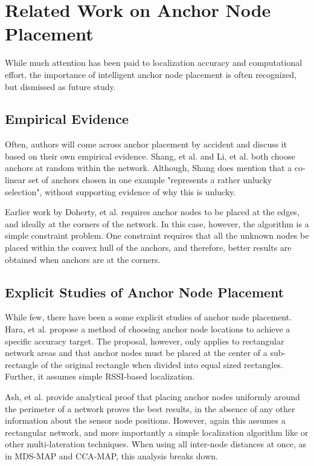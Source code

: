 \chapter{Related Work on Anchor Node Placement}
\label{chap:RelatedWork}
While much attention has been paid to localization accuracy and computational effort, the importance of intelligent anchor node placement is often recognized, but dismissed as future study.

\section{Empirical Evidence}
\label{sec:RelatedWorkEmpirical}
Often, authors will come across anchor placement by accident and discuss it based on their own empirical evidence.  Shang, et al.\cite[p. 964]{MDS-MAP} and Li, et al.\cite[p. 11]{CCA-MAP07} both choose anchors at random within the network.  Although, Shang does mention that a co-linear set of anchors chosen in one example "represents a rather unlucky selection", without supporting evidence of why this is unlucky.

Earlier work by Doherty, et al.\cite{Doherty} requires anchor nodes to be placed at the edges, and ideally at the corners of the network.  In this case, however, the algorithm is a simple constraint problem.  One constraint requires that all the unknown nodes be placed within the convex hull of the anchors, and therefore, better results are obtained when anchors are at the corners.

\section{Explicit Studies of Anchor Node Placement}
While few, there have been a some explicit studies of anchor node placement.  Hara, et al.\cite{Hara} propose a method of choosing anchor node locations to achieve a specific accuracy target.  The proposal, however, only applies to rectangular network areas and that anchor nodes must be placed at the center of a sub-rectangle of the original rectangle when divided into equal sized rectangles.  Further, it assumes simple RSSI-based localization.  

Ash, et al.\cite{Ash} provide analytical proof that placing anchor nodes uniformly around the perimeter of a network proves the best results, in the absence of any other information about the sensor node positions. However, again this assumes a rectangular network, and more importantly a simple localization algorithm like \cite{Doherty} or other multi-lateration techniques.  When using all inter-node distances at once, as in MDS-MAP and CCA-MAP, this analysis breaks down.

